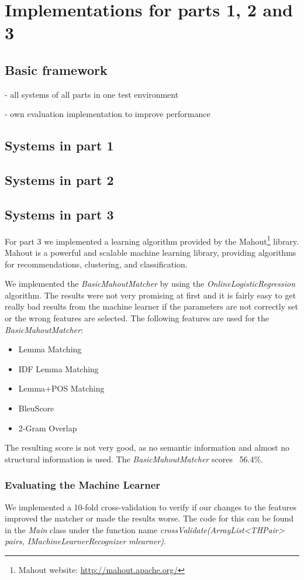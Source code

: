 
\section{Implementations for parts 1, 2 and 3}

\subsection{Basic framework}

- all systems of all parts in one test environment

- own evaluation implementation to improve performance

\subsection{Systems in part 1}
\subsection{Systems in part 2}
\subsection{Systems in part 3}
For part 3 we implemented a learning algorithm provided by the Mahout\footnote{Mahout website:
\url{http://mahout.apache.org/}} library. Mahout is a powerful and scalable machine learning library, providing
algorithms for recommendations, clustering, and classification.

We implemented the \textit{BasicMahoutMatcher} by using
the \textit{OnlineLogisticRegression} algorithm. The results were not very promising at first and it is fairly easy to
get really bad results from the machine learner if the parameters are not correctly set or the wrong features are
selected. The following features are used for the \textit{BasicMahoutMatcher}:

\begin{itemize}
    \item Lemma Matching
    \item IDF Lemma Matching
    \item Lemma+POS Matching
    \item BleuScore
    \item 2-Gram Overlap
\end{itemize}

The resulting score is not very good, as no semantic information and almost no structural information is used. The
\textit{BasicMahoutMatcher} scores ~56.4\%.

\subsubsection{Evaluating the Machine Learner}
We implemented a 10-fold cross-validation to verify if our changes to the features improved the matcher or made the
results worse. The code for this can be found in the \textit{Main} class under the function name
\textit{crossValidate(ArrayList<THPair> pairs, IMachineLearnerRecognizer mlearner)}.


